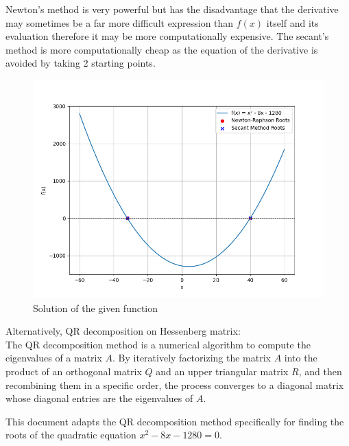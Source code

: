 \documentclass[journal]{IEEEtran}
\begin{document}
Newton's method is very powerful but has the disadvantage that the derivative may sometimes be a far more difficult expression than \(f(x)\) itself and its evaluation therefore it may be more computationally expensive. The secant's method is more computationally cheap as the equation of the derivative is avoided by taking 2 starting points.\\ 
\begin{figure}[!ht]
		\centering
		\includegraphics[width=\columnwidth]{figs/Figure_1.png}
		\caption{Solution of the given function}
		\label{stemplot}
	\end{figure}

Alternatively, QR decomposition on Hessenberg matrix:\\
The QR decomposition method is a numerical algorithm to compute the eigenvalues of a matrix \( A \). By iteratively factorizing the matrix \( A \) into the product of an orthogonal matrix \( Q \) and an upper triangular matrix \( R \), and then recombining them in a specific order, the process converges to a diagonal matrix whose diagonal entries are the eigenvalues of \( A \).

This document adapts the QR decomposition method specifically for finding the roots of the quadratic equation \( x^2 - 8x - 1280 = 0 \).
\end{document}
